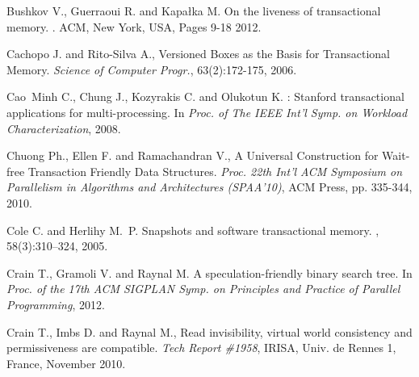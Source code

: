 \begin{thebibliography}{99}
{
Bushkov V., Guerraoui R. and Kapa\l{}ka M.
\newblock On the liveness of transactional memory.
.
 ACM, New York, USA, Pages 9-18 2012.



Cachopo J. and Rito-Silva A., 
Versioned Boxes as the Basis for Transactional Memory. 
{\it Science of Computer Progr.}, 63(2):172-175, 2006. 





Cao~Minh C., Chung J., Kozyrakis C. and Olukotun K.
: Stanford transactional applications for multi-processing.
\newblock In {\em Proc. of The IEEE Int'l Symp. on Workload Characterization},
  2008.



Chuong Ph., Ellen F. and Ramachandran V.,
A Universal Construction for Wait-free Transaction Friendly Data Structures.
{\it Proc. 22th  Int'l  ACM Symposium on Parallelism in Algorithms 
and Architectures   (SPAA'10)},  ACM Press, pp. 335-344,  2010. 

Cole C. and Herlihy M.~P.
\newblock Snapshots and software transactional memory.
, 58(3):310--324, 2005.



Crain T., Gramoli V. and Raynal M.
\newblock A speculation-friendly binary search tree.
\newblock In {\em Proc. of the 17th ACM SIGPLAN Symp. on Principles and
  Practice of Parallel Programming}, 2012.




Crain T., Imbs D. and Raynal M.,
Read invisibility, virtual world consistency and  permissiveness
are compatible.
{\it Tech Report \#1958}, IRISA, Univ. de  Rennes 1, France, November 2010. 



}
\end{thebibliography}
